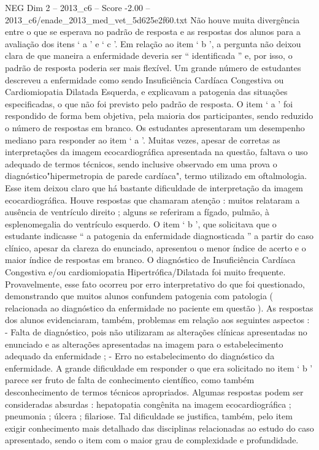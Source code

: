\begin{textsample}{NEG Dim 2 – 2013\_c6 – Score -2.00 – 2013\_c6/enade\_2013\_med\_vet\_5d625e2f60.txt}
Não houve muita divergência entre o que se esperava no padrão de resposta e as respostas dos alunos para a avaliação dos itens ‘ a ’ e ‘ c ’.
Em relação ao item ‘ b ’, a pergunta não deixou clara de que maneira a enfermidade deveria ser “ identificada ” e, por isso, o padrão de resposta poderia ser mais flexível.
Um grande número de estudantes descreveu a enfermidade como sendo Insuficiência Cardíaca Congestiva ou Cardiomiopatia Dilatada Esquerda, e explicavam a patogenia das situações especificadas, o que não foi previsto pelo padrão de resposta.
O item ‘ a ’ foi respondido de forma bem objetiva, pela maioria dos participantes, sendo reduzido o número de respostas em branco.
Os estudantes apresentaram um desempenho mediano para responder ao item ‘ a ’.
Muitas vezes, apesar de corretas as interpretações da imagem ecocardiográfica apresentada na questão, faltava o uso adequado de termos técnicos, sendo inclusive observado em uma prova o diagnóstico"hipermetropia de parede cardíaca", termo utilizado em oftalmologia.
Esse item deixou claro que há bastante dificuldade de interpretação da imagem ecocardiográfica.
Houve respostas que chamaram atenção : muitos relataram a ausência de ventrículo direito ; alguns se referiram a fígado, pulmão, à esplenomegalia do ventrículo esquerdo.
O item ‘ b ’, que solicitava que o estudante indicasse “ a patogenia da enfermidade diagnosticada ” a partir do caso clínico, apesar da clareza do enunciado, apresentou o menor índice de acerto e o maior índice de respostas em branco.
O diagnóstico de Insuficiência Cardíaca Congestiva e/ou cardiomiopatia Hipertrófica/Dilatada foi muito frequente.
Provavelmente, esse fato ocorreu por erro interpretativo do que foi questionado, demonstrando que muitos alunos confundem patogenia com patologia ( relacionada ao diagnóstico da enfermidade no paciente em questão ).
As respostas dos alunos evidenciaram, também, problemas em relação aos seguintes aspectos : - Falta de diagnóstico, pois não utilizaram as alterações clínicas apresentadas no enunciado e as alterações apresentadas na imagem para o estabelecimento adequado da enfermidade ; - Erro no estabelecimento do diagnóstico da enfermidade.
A grande dificuldade em responder o que era solicitado no item ‘ b ’ parece ser fruto de falta de conhecimento científico, como também desconhecimento de termos técnicos apropriados.
Algumas respostas podem ser consideradas absurdas : hepatopatia congênita na imagem ecocardiográfica ; pneumonia ; úlcera ; filariose.
Tal dificuldade se justifica, também, pelo item exigir conhecimento mais detalhado das disciplinas relacionadas ao estudo do caso apresentado, sendo o item com o maior grau de complexidade e profundidade.

\end{textsample}
